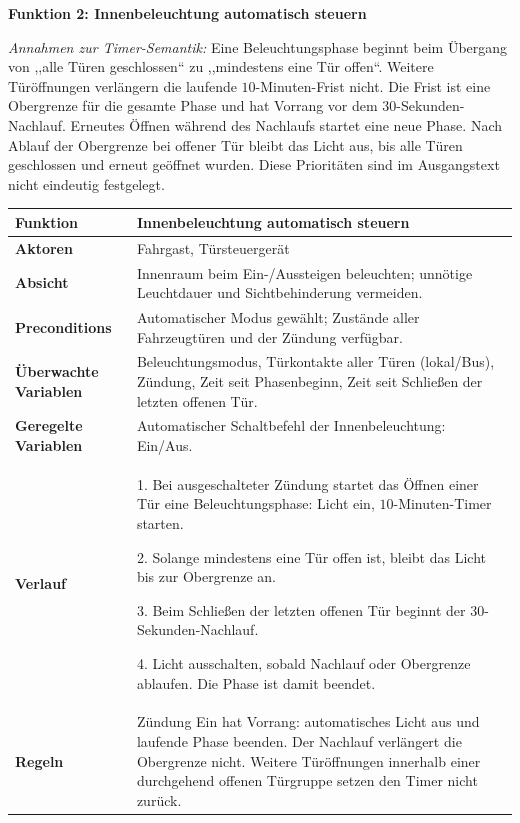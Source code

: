\begin{loesung}
\clearpage
\textbf{Funktion 2: Innenbeleuchtung automatisch steuern}

\emph{Annahmen zur Timer-Semantik:} Eine Beleuchtungsphase beginnt beim Übergang von ,,alle Türen geschlossen`` zu ,,mindestens eine Tür offen``. Weitere Türöffnungen verlängern die laufende $10$-Minuten-Frist nicht. Die Frist ist eine Obergrenze für die gesamte Phase und hat Vorrang vor dem $30$-Sekunden-Nachlauf. Erneutes Öffnen während des Nachlaufs startet eine neue Phase. Nach Ablauf der Obergrenze bei offener Tür bleibt das Licht aus, bis alle Türen geschlossen und erneut geöffnet wurden. Diese Prioritäten sind im Ausgangstext nicht eindeutig festgelegt.

\begingroup
\small
\renewcommand{\arraystretch}{1.15}
\begin{tabularx}{\linewidth}{|p{3.3cm}|X|}
\hline
\textbf{Funktion} & \textbf{Innenbeleuchtung automatisch steuern} \\ \hline
\textbf{Aktoren} & Fahrgast, Türsteuergerät \\ \hline
\textbf{Absicht} & Innenraum beim Ein-/Aussteigen beleuchten; unnötige Leuchtdauer und Sichtbehinderung vermeiden. \\ \hline
\textbf{Preconditions} & Automatischer Modus gewählt; Zustände aller Fahrzeugtüren und der Zündung verfügbar. \\ \hline
\textbf{Überwachte Variablen} & Beleuchtungsmodus, Türkontakte aller Türen (lokal/Bus), Zündung, Zeit seit Phasenbeginn, Zeit seit Schließen der letzten offenen Tür. \\ \hline
\textbf{Geregelte Variablen} & Automatischer Schaltbefehl der Innenbeleuchtung: Ein/Aus. \\ \hline
\textbf{Verlauf} &
1. Bei ausgeschalteter Zündung startet das Öffnen einer Tür eine Beleuchtungsphase: Licht ein, $10$-Minuten-Timer starten.
\par 2. Solange mindestens eine Tür offen ist, bleibt das Licht bis zur Obergrenze an.
\par 3. Beim Schließen der letzten offenen Tür beginnt der $30$-Sekunden-Nachlauf.
\par 4. Licht ausschalten, sobald Nachlauf oder Obergrenze ablaufen. Die Phase ist damit beendet. \\ \hline
\textbf{Regeln} &
Zündung Ein hat Vorrang: automatisches Licht aus und laufende Phase beenden. Der Nachlauf verlängert die Obergrenze nicht. Weitere Türöffnungen innerhalb einer durchgehend offenen Türgruppe setzen den Timer nicht zurück. \\ \hline

\end{tabularx}
\end{loesung}
